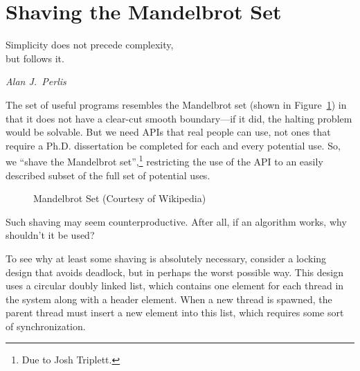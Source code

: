 \section{Shaving the Mandelbrot Set}
\label{sec:easy:Shaving the Mandelbrot Set}
%
\epigraph{Simplicity does not precede complexity, \\ but follows it.}
	 {\emph{Alan J.~Perlis}}

The set of useful programs resembles the Mandelbrot set
(shown in Figure~\ref{fig:easy:Mandelbrot Set})
in that it does
not have a clear-cut smooth boundary---if it did, the halting problem
would be solvable.
But we need APIs that real people can use, not ones that require a
Ph.D. dissertation be completed for each and every potential use.
So, we ``shave the Mandelbrot set'',\footnote{
	Due to Josh Triplett.}
restricting the use of the
API to an easily described subset of the full set of potential uses.

\begin{figure}[tbp]
\centering
{}
\caption{Mandelbrot Set (Courtesy of Wikipedia)}
\label{fig:easy:Mandelbrot Set}
\end{figure}

Such shaving may seem counterproductive.
After all, if an algorithm works, why shouldn't it be used?

To see why at least some shaving is absolutely necessary, consider
a locking design that avoids deadlock, but in perhaps the worst possible way.
This design uses a circular doubly linked list, which contains one
element for each thread in the system along with a header element.
When a new thread is spawned, the parent thread must insert a new
element into this list, which requires some sort of synchronization.

